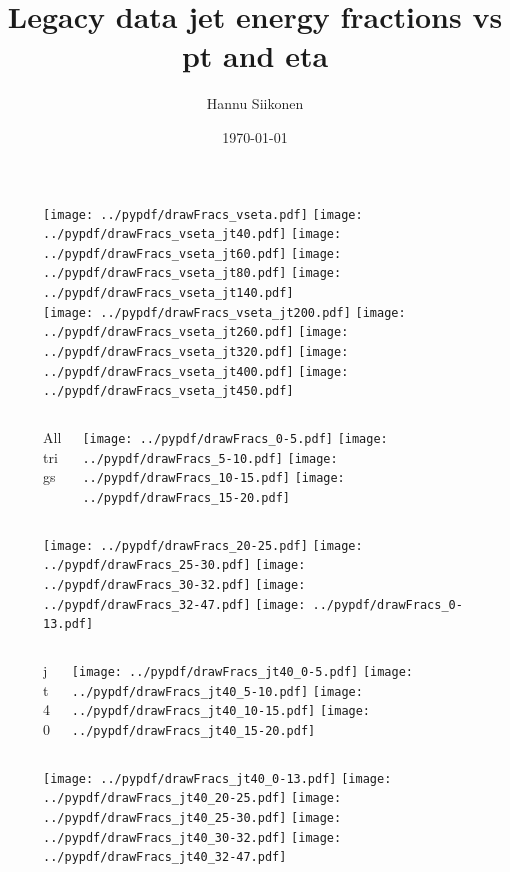 \documentclass[aspectratio=169]{beamer}
\title[Legacy data jet energy fractions vs pt]{Legacy data jet energy fractions vs pt and eta}
\author{Hannu Siikonen}
\institute{Helsinki Institute of Physics \\ \vspace{0.25cm} Instructor Adj.~Prof.~Mikko~Voutilainen}
\date{\today}
\begin{document}
\titlepage

\newpage

\begin{figure}[p]
\flushleft
\texttt{[image: ../pypdf/drawFracs\_vseta.pdf]}
\texttt{[image: ../pypdf/drawFracs\_vseta\_jt40.pdf]}
\texttt{[image: ../pypdf/drawFracs\_vseta\_jt60.pdf]}
\texttt{[image: ../pypdf/drawFracs\_vseta\_jt80.pdf]}
\texttt{[image: ../pypdf/drawFracs\_vseta\_jt140.pdf]}\\
\texttt{[image: ../pypdf/drawFracs\_vseta\_jt200.pdf]}
\texttt{[image: ../pypdf/drawFracs\_vseta\_jt260.pdf]}
\texttt{[image: ../pypdf/drawFracs\_vseta\_jt320.pdf]}
\texttt{[image: ../pypdf/drawFracs\_vseta\_jt400.pdf]}
\texttt{[image: ../pypdf/drawFracs\_vseta\_jt450.pdf]}
\end{figure}

\begin{figure}[p]
\flushleft
\begin{columns}[T]
\begin{column}{.2\linewidth}
\centering
All trigs
\end{column}
\begin{column}{.8\linewidth}
\texttt{[image: ../pypdf/drawFracs\_0-5.pdf]}
\texttt{[image: ../pypdf/drawFracs\_5-10.pdf]}
\texttt{[image: ../pypdf/drawFracs\_10-15.pdf]}
\texttt{[image: ../pypdf/drawFracs\_15-20.pdf]}
\end{column}
\end{columns}
\texttt{[image: ../pypdf/drawFracs\_20-25.pdf]}
\texttt{[image: ../pypdf/drawFracs\_25-30.pdf]}
\texttt{[image: ../pypdf/drawFracs\_30-32.pdf]}
\texttt{[image: ../pypdf/drawFracs\_32-47.pdf]}
\texttt{[image: ../pypdf/drawFracs\_0-13.pdf]}
\end{figure}

\begin{figure}[p]
\flushleft
\begin{columns}[T]
\begin{column}{.2\linewidth}
\centering
jt40
\end{column}
\begin{column}{.8\linewidth}
\texttt{[image: ../pypdf/drawFracs\_jt40\_0-5.pdf]}
\texttt{[image: ../pypdf/drawFracs\_jt40\_5-10.pdf]}
\texttt{[image: ../pypdf/drawFracs\_jt40\_10-15.pdf]}
\texttt{[image: ../pypdf/drawFracs\_jt40\_15-20.pdf]}
\end{column}
\end{columns}
\texttt{[image: ../pypdf/drawFracs\_jt40\_0-13.pdf]}
\texttt{[image: ../pypdf/drawFracs\_jt40\_20-25.pdf]}
\texttt{[image: ../pypdf/drawFracs\_jt40\_25-30.pdf]}
\texttt{[image: ../pypdf/drawFracs\_jt40\_30-32.pdf]}
\texttt{[image: ../pypdf/drawFracs\_jt40\_32-47.pdf]}
\end{figure}
\end{document}
